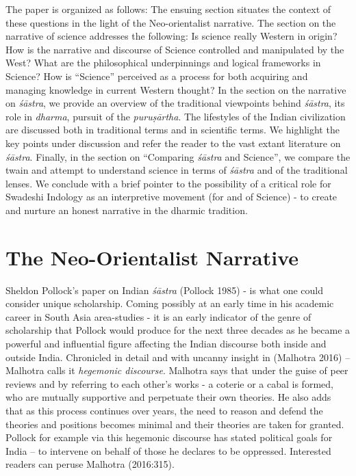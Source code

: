 The paper is organized as follows: The ensuing section situates the context of these questions in the light of the Neo-orientalist narrative. The section on the narrative of science addresses the following: Is science really Western in origin? How is the narrative and discourse of Science controlled and manipulated by the West? What are the philosophical underpinnings and logical frameworks in Science? How is “Science” perceived as a process for both acquiring and managing knowledge in current Western thought? In the section on the narrative on \textit{śāstra}, we provide an overview of the traditional viewpoints behind \textit{śāstra}, its role in \textit{dharma}, pursuit of the \textit{puruṣārtha}. The lifestyles of the Indian civilization are discussed both in traditional terms and in scientific terms. We highlight the key points under discussion and refer the reader to the vast extant literature on \textit{śāstra}. Finally, in the section on “Comparing \textit{śāstra} and Science”, we compare the twain and attempt to understand science in terms of \textit{śāstra} and of the traditional lenses. We conclude with a brief pointer to the possibility of a critical role for Swadeshi Indology as an interpretive movement (for and of Science) - to create and nurture an honest narrative in the dharmic tradition.

\vspace{-.3cm}

\section*{The Neo-Orientalist Narrative}

\vskip -3pt

Sheldon Pollock’s paper on Indian \textit{śāstra} (Pollock 1985) - is what one could consider unique scholarship. Coming possibly at an early time in his academic career in South Asia area-studies - it is an early indicator of the genre of scholarship that Pollock would produce for the next three decades as he became a powerful and influential figure affecting the Indian discourse both inside and outside India. Chronicled in detail and with uncanny insight in (Malhotra 2016) – Malhotra calls it \textit{hegemonic discourse}. Malhotra says that under the guise of peer reviews and by referring to each other’s works - a coterie or a cabal is formed, who are mutually supportive and perpetuate their own theories. He also adds that as this process continues over years, the need to reason and defend the theories and positions becomes minimal and their theories are taken for granted. Pollock for example via this hegemonic discourse has stated political goals for India – to intervene on behalf of those he declares to be oppressed. Interested readers can peruse Malhotra (2016:315).

